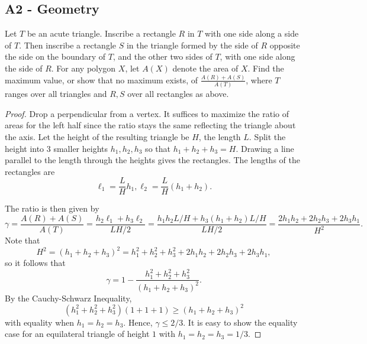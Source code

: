 \documentclass[11pt]{scrartcl}
\begin{document}
\subsection{A2 - Geometry}
\begin{Prob} Let $T$ be an acute triangle. Inscribe a rectangle $R$ in $T$ with one side along a side of $T$. Then inscribe a rectangle $S$ in the triangle formed by the side of $R$ opposite the side on the boundary of $T$, and the other two sides of $T$, with one side along the side of $R$. For any polygon $X$, let $A(X)$ denote the area of $X$. Find the maximum value, or show that no maximum exists, of $\frac{A(R) + A(S)}{A(T)}$, where $T$ ranges over all triangles and $R, S$ over all rectangles as above.
\end{Prob}
\begin{proof}
Drop a perpendicular from a vertex.  It suffices to maximize the ratio of areas for the left half since the ratio stays the same reflecting the triangle about the axis.  Let the height of the resulting triangle be $H$, the length $L$.  Split the height into 3 smaller heights $h_1, h_2, h_3$ so that $h_1 + h_2 + h_3 = H$.  Drawing a line parallel to the length through the heights gives the rectangles.  The lengths of the rectangles are
$$\ell_1 = \frac{L}{H}h_1, \ell_2 = \frac{L}{H}(h_1 + h_2).$$

The ratio is then given by 
$$\gamma = \frac{A(R) + A(S)}{A(T)} = \frac{h_2\ell_1 + h_3\ell_2}{LH/2} = \frac{h_1h_2L/H + h_3(h_1+h_2)L/H}{LH/2} = \frac{2h_1h_2 + 2h_2h_3 + 2h_3h_1}{H^2}.$$
Note that 
$$H^2 = (h_1+h_2+h_3)^2 = h_1^2 + h_2^2 + h_3^2 + 2h_1h_2 + 2h_2h_3 + 2h_3h_1,$$
so it follows that 
$$\gamma = 1 - \frac{h_1^2+h_2^2+h_3^2}{(h_1+h_2+h_3)^2}.$$
By the Cauchy-Schwarz Inequality,
$$(h_1^2+h_2^2+h_3^2)(1+1+1) \ge (h_1+h_2+h_3)^2$$
with equality when $h_1=h_2=h_3$.  Hence, $\gamma \le \boxed{2/3}$.  It is easy to show the equality case for an equilateral triangle of height $1$ with $h_1=h_2=h_3 = 1/3$.
\end{proof}
\end{document}
